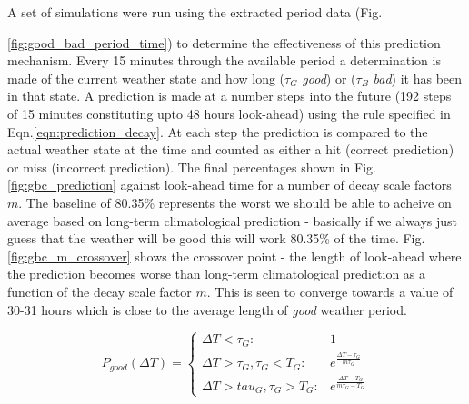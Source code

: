 {A set of simulations were run using the extracted period data (Fig. {\ref{fig:good_bad_period_time}) to determine the effectiveness of this prediction mechanism. Every 15 minutes through the available period a determination is made of the current weather state and how long ($\tau_G$ \emph{good}) or ($\tau_B$ \emph{bad}) it has been in that state. A prediction is made at a number steps into the future (192 steps of 15 minutes constituting upto 48 hours look-ahead) using the rule specified in Eqn.\ref{eqn:prediction_decay}. At each step the prediction is compared to the actual weather state at the time and counted as either a hit (correct prediction) or miss (incorrect prediction). The final percentages shown in Fig. \ref{fig:gbc_prediction} against look-ahead time for a number of decay scale factors $m$. The baseline of 80.35\% represents the worst we should be able to acheive on average based on long-term climatological prediction - basically if we always just guess that the weather will be good this will work 80.35\% of the time. Fig. \ref{fig:gbc_m_crossover} shows the crossover point - the length of look-ahead where the prediction becomes worse than long-term climatological prediction as a function of the decay scale factor $m$. This is seen to converge towards a value of 30-31 hours which is close to the average length of \emph{good} weather period.

\begin{equation}
\label{eqn:prediction_decay}
P_{good}(\Delta T) = 
\begin{cases} 
\Delta T < \tau_G : & 1   \\ 
\Delta T > \tau_G, \tau_G < T_G : & e^{\frac{\Delta T-\tau_G}{m \tau_G}} \\
\Delta T > tau_G , \tau_G > T_G : & e^{\frac{\Delta T-T_G}{m \tau_G-T_G}}
\end{cases}
\end{equation}


}}
